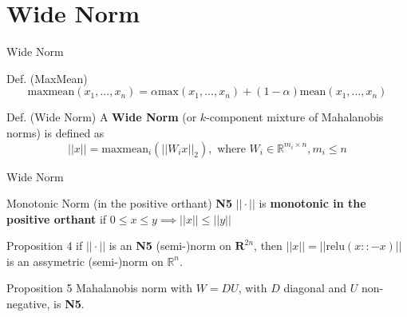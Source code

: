 \documentclass{beamer}
\begin{document}
\section{Wide Norm}
\begin{frame}{Wide Norm}
    \begin{block}{Def. (MaxMean)}
    \[
        \text{maxmean}(x_1, ..., x_n) = \alpha \text{max}(x_1, ..., x_n) + (1 - \alpha)\text{mean}(x_1, ..., x_n)
    \]
    \end{block}

    \begin{block}{Def. (Wide Norm)}
        A \textbf{Wide Norm} (or $k$-component mixture of Mahalanobis norms) is defined as 
        \[
        ||x|| = \text{maxmean}_i(||W_i x||_2), \text{ where } W_i \in \mathbb{R}^{m_i \times n}, m_i \leq n
        \]
    \end{block}
\end{frame}

\begin{frame}{Wide Norm}
    \begin{block}{Monotonic Norm (in the positive orthant)}
        \textbf{N5} $||\cdot||$ is \textbf{monotonic in the positive orthant} if $0 \leq x \leq y \implies ||x|| \leq ||y||$
    \end{block}

    \begin{block}{Proposition 4}
        if $||\cdot||$ is an \textbf{N5} (semi-)norm on $\mathbf{R}^{2n}$, then $||x|| = ||\text{relu}(x :: -x)||$ is an assymetric (semi-)norm on $\mathbb{R}^n$.
    \end{block}

    \begin{block}{Proposition 5}
        Mahalanobis norm with $W = DU$, with $D$ diagonal and $U$ non-negative, is \textbf{N5}.
    \end{block}
\end{frame}
\end{document}
